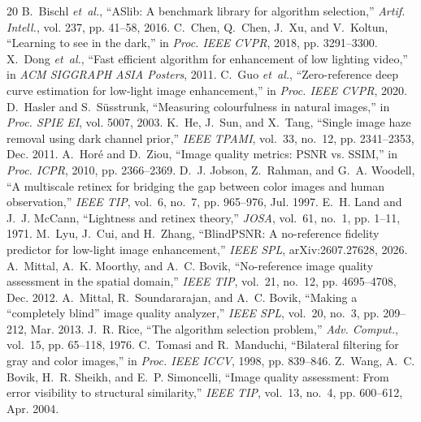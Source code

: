\documentclass[journal]{IEEEtran}
\begin{document}
\renewcommand{\footnotesize}{\fontsize{7.5pt}{8.5pt}\selectfont}

\begin{thebibliography}{20}
\footnotesize
\setlength{\itemsep}{-2.2pt}
\setlength{\parskip}{0pt}
B.~Bischl \emph{et~al.}, ``ASlib: A benchmark library for algorithm selection,'' \emph{Artif. Intell.}, vol. 237, pp. 41--58, 2016.
C.~Chen, Q.~Chen, J.~Xu, and V.~Koltun, ``Learning to see in the dark,'' in \emph{Proc. IEEE CVPR}, 2018, pp. 3291--3300.
X.~Dong \emph{et~al.}, ``Fast efficient algorithm for enhancement of low lighting video,'' in \emph{ACM SIGGRAPH ASIA Posters}, 2011.
C.~Guo \emph{et~al.}, ``Zero-reference deep curve estimation for low-light image enhancement,'' in \emph{Proc. IEEE CVPR}, 2020.
D.~Hasler and S.~S{\"u}sstrunk, ``Measuring colourfulness in natural images,'' in \emph{Proc. SPIE EI}, vol. 5007, 2003.
K.~He, J.~Sun, and X.~Tang, ``Single image haze removal using dark channel prior,'' \emph{IEEE TPAMI}, vol.~33, no.~12, pp. 2341--2353, Dec. 2011.
A.~Hor{\'e} and D.~Ziou, ``Image quality metrics: PSNR vs. SSIM,'' in \emph{Proc. ICPR}, 2010, pp. 2366--2369.
D.~J. Jobson, Z.~Rahman, and G.~A. Woodell, ``A multiscale retinex for bridging the gap between color images and human observation,'' \emph{IEEE TIP}, vol.~6, no.~7, pp. 965--976, Jul. 1997.
E.~H. Land and J.~J. McCann, ``Lightness and retinex theory,'' \emph{JOSA}, vol.~61, no.~1, pp. 1--11, 1971.
M.~Lyu, J.~Cui, and H.~Zhang, ``BlindPSNR: A no-reference fidelity predictor for low-light image enhancement,'' \emph{IEEE SPL}, arXiv:2607.27628, 2026.
A.~Mittal, A.~K. Moorthy, and A.~C. Bovik, ``No-reference image quality assessment in the spatial domain,'' \emph{IEEE TIP}, vol.~21, no.~12, pp. 4695--4708, Dec. 2012.
A.~Mittal, R.~Soundararajan, and A.~C. Bovik, ``Making a ``completely blind'' image quality analyzer,'' \emph{IEEE SPL}, vol.~20, no.~3, pp. 209--212, Mar. 2013.
J.~R. Rice, ``The algorithm selection problem,'' \emph{Adv. Comput.}, vol.~15, pp. 65--118, 1976.
C.~Tomasi and R.~Manduchi, ``Bilateral filtering for gray and color images,'' in \emph{Proc. IEEE ICCV}, 1998, pp. 839--846.
Z.~Wang, A.~C. Bovik, H.~R. Sheikh, and E.~P. Simoncelli, ``Image quality assessment: From error visibility to structural similarity,'' \emph{IEEE TIP}, vol.~13, no.~4, pp. 600--612, Apr. 2004.

\end{thebibliography}
\end{document}
